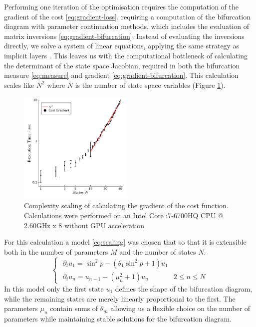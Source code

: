 \documentclass{article}
\begin{document}
Performing one iteration of the optimisation requires the computation of the gradient of the cost \eqref{eq:gradient-loss}, requiring a computation of the bifurcation diagram with parameter continuation methods, which includes the evaluation of matrix inversions \eqref{eq:gradient-bifurcation}. Instead of evaluating the inversions directly, we solve a system of linear equations, applying the same strategy as implicit layers \cite{Look2020DifferentiableLayers,Bai2019DeepModels}. This leaves us with the computational bottleneck of calculating the determinant of the state space Jacobian, required in both the bifurcation measure \eqref{eq:measure} and gradient \eqref{eq:gradient-bifurcation}. This calculation scales like $N^2$ where $N$ is the number of state space variables (Figure \ref{fig:scaling}).

\begin{figure}[ht]%
\centering
\includegraphics[width=0.48\textwidth]{scaling}
\caption{Complexity scaling of calculating the gradient of the cost function. Calculations were performed on an Intel Core i7-6700HQ CPU @ 2.60GHz x 8 without GPU acceleration}
\label{fig:scaling}
\end{figure}

For this calculation a model \eqref{eq:scaling} was chosen that so that it is extensible both in the number of parameters $M$ and the number of states $N$. 
\begin{equation}
\begin{cases}
    \,\,\partial_t u_1 = \sin^{2}\!p - (\theta_1\sin^{2}\!p+1)u_1\\
    \,\,\partial_t u_n = u_{n-1} - (\mu_n^2+1) u_n & 2\le n\leq N
\end{cases}
\label{eq:scaling}
\end{equation}
In this model only the first state $u_1$ defines the shape of the bifurcation diagram, while the remaining states are merely linearly proportional to the first. The parameters $\mu_n$ contain sums of $\theta_m$ allowing us a flexible choice on the number of parameters while maintaining stable solutions for the bifurcation diagram.
\end{document}
